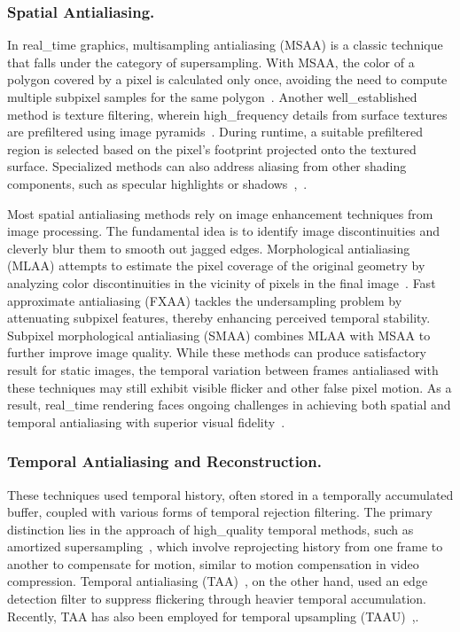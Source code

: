 \subsubsection{Spatial Antialiasing.}
In real_time graphics, multisampling antialiasing (MSAA) is a classic technique that falls under the category of supersampling. With MSAA, the color of a polygon covered by a pixel is calculated only once, avoiding the need to compute multiple subpixel samples for the same polygon~\cite{akeley1993reality}. Another well_established method is texture filtering, wherein high_frequency details from surface textures are prefiltered using image pyramids~\cite{williams1983pyramidal}. During runtime, a suitable prefiltered region is selected based on the pixel's footprint projected onto the textured surface. Specialized methods can also address aliasing from other shading components, such as specular highlights or shadows~\cite{kaplanyan2016filtering},~\cite{reeves1987rendering}.

Most spatial antialiasing methods rely on image enhancement techniques from image processing. The fundamental idea is to identify image discontinuities and cleverly blur them to smooth out jagged edges. Morphological antialiasing (MLAA) attempts to estimate the pixel coverage of the original geometry by analyzing color discontinuities in the vicinity of pixels in the final image~\cite{reshetov2009morphological}. Fast approximate antialiasing (FXAA) tackles the undersampling problem by attenuating subpixel features, thereby enhancing perceived temporal stability. Subpixel morphological antialiasing (SMAA) combines MLAA with MSAA to further improve image quality. While these methods can produce satisfactory result for static images, the temporal variation between frames antialiased with these techniques may still exhibit visible flicker and other false pixel motion. As a result, real_time rendering faces ongoing challenges in achieving both spatial and temporal antialiasing with superior visual fidelity~\cite{jimenez2012smaa}.

\subsubsection{Temporal Antialiasing and Reconstruction.}
These techniques used temporal history, often stored in a temporally accumulated buffer, coupled with various forms of temporal rejection filtering. The primary distinction lies in the approach of high_quality temporal methods, such as amortized supersampling~\cite{yang2009amortized}, which involve reprojecting history from one frame to another to compensate for motion, similar to motion compensation in video compression. Temporal antialiasing (TAA)~\cite{karis2014high}, on the other hand, used an edge detection filter to suppress flickering through heavier temporal accumulation. Recently, TAA has also been employed for temporal upsampling (TAAU)~\cite{osman2021design},.

